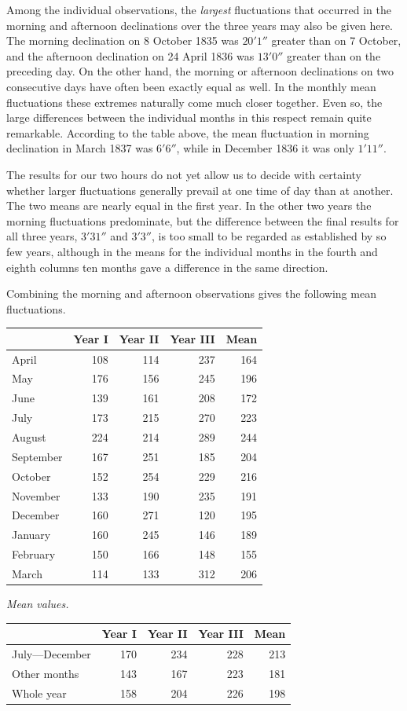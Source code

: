 Among the individual observations, the \textit{largest} fluctuations that occurred in the morning and afternoon declinations over the three years may also be given here. The morning declination on 8 October 1835 was $20'1''$ greater than on 7 October, and the afternoon declination on 24 April 1836 was $13'0''$ greater than on the preceding day. On the other hand, the morning or afternoon declinations on two consecutive days have often been exactly equal as well. In the monthly mean fluctuations these extremes naturally come much closer together. Even so, the large differences between the individual months in this respect remain quite remarkable. According to the table above, the mean fluctuation in morning declination in March 1837 was $6'6''$, while in December 1836 it was only $1'11''$.

The results for our two hours do not yet allow us to decide with certainty whether larger fluctuations generally prevail at one time of day than at another. The two means are
nearly equal in the first year. In the other two years the morning fluctuations predominate, but the difference between the final results for all three years, $3'31''$ and $3'3''$, is too small to be regarded as established by so few years, although in the means for the individual months in the fourth and eighth columns ten months gave a difference in the same direction.

Combining the morning and afternoon observations gives the following mean fluctuations.
\begin{center}\small
\begin{tabular}{l|r|r|r||r}
&Year I&Year II&Year III&Mean\\\hline
April&108&114&237&164\\
May&176&156&245&196\\
June&139&161&208&172\\
July&173&215&270&223\\
August&224&214&289&244\\
September&167&251&185&204\\
October&152&254&229&216\\
November&133&190&235&191\\
December&160&271&120&195\\
January&160&245&146&189\\
February&150&166&148&155\\
March&114&133&312&206
\end{tabular}
\end{center}
\begin{center}\small
\textit{Mean values.}\par\smallskip
\begin{tabular}{l|r|r|r||r}
&Year I&Year II&Year III&Mean\\\hline
July---December&170&234&228&213\\
Other months&143&167&223&181\\
Whole year&158&204&226&198
\end{tabular}
\end{center}

